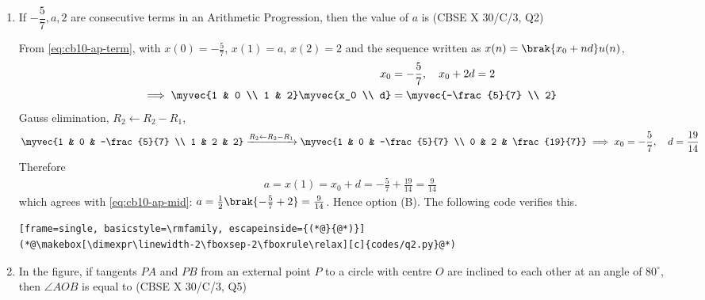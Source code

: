 \begin{enumerate}[label=\thesubsection.\arabic*, ref=\thesubsection.\theenumi,itemsep=0pt]

\item If $-\dfrac{5}{7}, a, 2$ are consecutive terms in an Arithmetic Progression, then the value of $a$ is
\hfill (CBSE X 30/C/3, Q2)
\begin{enumerate}[itemsep=0pt]
\end{enumerate}

\solution From \eqref{eq:cb10-ap-term}, with $x(0) = -\frac{5}{7}$, $x(1) = a$, $x(2) = 2$ and the sequence written as $x(n) = \brak{x_0 + nd}u(n)$,
\begin{align}
x_0 &= -\frac{5}{7}, \quad x_0 + 2d = 2 \\
\implies \myvec{1 & 0 \\ 1 & 2}\myvec{x_0 \\ d} &= \myvec{-\frac{5}{7} \\ 2}
\end{align}
Gauss elimination, $R_2 \leftarrow R_2 - R_1$,
\begin{align}
\myvec{1 & 0 & -\frac{5}{7} \\ 1 & 2 & 2} \xrightarrow{R_2 \leftarrow R_2 - R_1} \myvec{1 & 0 & -\frac{5}{7} \\ 0 & 2 & \frac{19}{7}}
\implies x_0 = -\frac{5}{7}, \quad d = \frac{19}{14}
\end{align}
Therefore
\begin{align}
a = x(1) = x_0 + d = -\frac{5}{7} + \frac{19}{14} = \frac{9}{14}
\end{align}
which agrees with \eqref{eq:cb10-ap-mid}: $a = \frac{1}{2}\brak{-\frac{5}{7}+2} = \frac{9}{14}$. Hence option (B). The following code verifies this.
\begin{lstlisting}[frame=single, basicstyle=\rmfamily, escapeinside={(*@}{@*)}]
(*@\makebox[\dimexpr\linewidth-2\fboxsep-2\fboxrule\relax][c]{codes/q2.py}@*)
\end{lstlisting}

\item In the figure, if tangents $PA$ and $PB$ from an external point $P$ to a circle with centre $O$ are inclined to each other at an angle of $80^\circ$, then $\angle AOB$ is equal to
\hfill (CBSE X 30/C/3, Q5)
\begin{enumerate}[itemsep=0pt]
\end{enumerate}


\end{enumerate}
